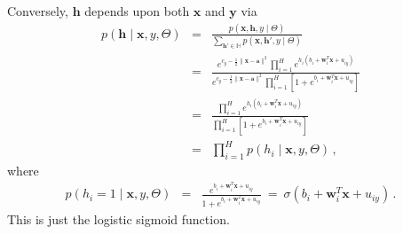 \documentclass[a4paper]{article}
\renewcommand{\v}[1]{\mathbf{#1}}
\begin{document}
Conversely, $\v{h}$ depends upon both $\v{x}$ and $\v{y}$ via
\begin{eqnarray}
    p(\v{h}\;|\;\v{x},y,\Theta) & = & 
    \frac{p(\v{x},\v{h},y\;|\;\Theta)}
{\sum_{\v{h}'\in\mathbb{H}}p(\v{x},\v{h}',y\;|\;\Theta)}
\nonumber\\&=&
\frac{
    e^{c_y-\frac{1}{2}\|\v{x}-\v{a}\|^2}
\prod_{i=1}^{H}e^{h_i(b_i+ \v{w}_i^T\v{x}+u_{iy})}
}
{
   e^{c_{y}-\frac{1}{2}\|\v{x}-\v{a}\|^2}
  \prod_{i=1}^{H}\left[1+e^{b_i+ \v{w}_i^T\v{x}+u_{iy}}\right]
}
\nonumber\\&=&
\frac{
\prod_{i=1}^{H}e^{h_i(b_i+ \v{w}_i^T\v{x}+u_{iy})}
}
{
  \prod_{i=1}^{H}\left[1+e^{b_i+ \v{w}_i^T\v{x}+u_{iy}}\right]
}
\nonumber\\&=&
  \prod_{i=1}^{H}p(h_i\;|\;\v{x},y,\Theta)
\,,
\end{eqnarray}
where 
\begin{eqnarray}
  p(h_i=1\;|\;\v{x},y,\Theta) & = & 
  \frac{e^{b_i+\v{w}_i^T\v{x}+u_{iy}}}{1+e^{b_i+\v{w}_i^T\v{x}+u_{iy}}}
~=~\sigma(b_i+\v{w}_i^T\v{x}+u_{iy})
  \,.
\label{eq:ph1}
\end{eqnarray}
This is just the logistic sigmoid function.
\end{document}
